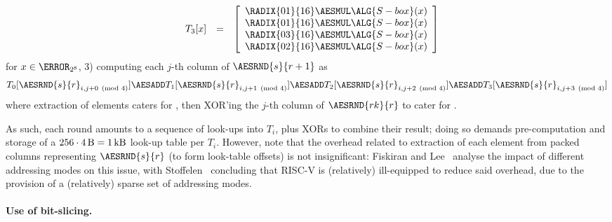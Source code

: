 \[\begin{array}{cc}
\begin{array}{lcl}
   \end{array}
   &
   \begin{array}{lcl}
   T_3[x] &=& \left[\begin{array}{c}
                    \RADIX{01}{16} \AESMUL \ALG{S-box}( x ) \\
                    \RADIX{01}{16} \AESMUL \ALG{S-box}( x ) \\
                    \RADIX{03}{16} \AESMUL \ALG{S-box}( x ) \\
                    \RADIX{02}{16} \AESMUL \ALG{S-box}( x ) \\
                    \end{array} \right]
   \end{array}
   \end{array}
   \]
   for $x \in \F_{2^8}$,
3) computing each $j$-th column of $\AESRND{s}{r+1}$ as
   \[
   T_0[ \AESRND{s}{r}_{i, j + 0 \pmod{4}} ] \AESADD
   T_1[ \AESRND{s}{r}_{i, j + 1 \pmod{4}} ] \AESADD
   T_2[ \AESRND{s}{r}_{i, j + 2 \pmod{4}} ] \AESADD
   T_3[ \AESRND{s}{r}_{i, j + 3 \pmod{4}} ]
   \]
   where extraction of elements caters for , then XOR'ing 
   the $j$-th column of $\AESRND{rk}{r}$ to cater for .

As such, each round amounts to a sequence of look-ups into $T_i$, plus XORs 
to combine their result; 
doing so demands pre-computation and storage of a
$
256 \cdot \SI{4}{\byte} = \SI{1}{\kilo\byte}
$
look-up table per $T_i$.
However, note that the overhead related to extraction of each element from 
packed columns representing $\AESRND{s}{r}$ 
(to form look-table offsets) 
is not insignificant:
Fiskiran and Lee~\cite{FisLee:01}
analyse the impact of different addressing modes on this issue, with
Stoffelen~\cite[Section 3.1]{Stoffelen:19}
concluding that RISC-V is (relatively) ill-equipped to reduce said overhead,
due to the provision of a (relatively) sparse set of addressing modes.


\paragraph{Use of bit-slicing.}


\cite{MatNak:07,Konighofer:08,KasSch:09}

\cite{Stoffelen:19}

